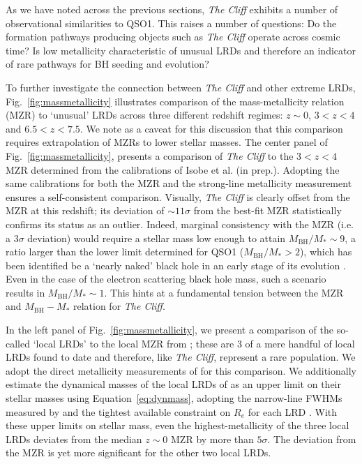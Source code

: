 \documentclass[fleqn,usenatbib]{mnras}
\newcommand{\cliff}{\textit{The Cliff}\xspace}
\begin{document}
As we have noted across the previous sections, \cliff exhibits a number of observational similarities to QSO1. This raises a number of questions: Do the formation pathways producing objects such as \cliff operate across cosmic time? Is low metallicity characteristic of unusual LRDs and therefore an indicator of rare pathways for BH seeding and evolution? 

To further investigate the connection between \cliff and other extreme LRDs, Fig.~\ref{fig:massmetallicity} illustrates comparison of the mass-metallicity relation (MZR) to `unusual' LRDs across three different redshift regimes: $z\sim0$, $3<z<4$ and $6.5<z<7.5$. We note as a caveat for this discussion that this comparison requires extrapolation of MZRs to lower stellar masses. The center panel of Fig.~\ref{fig:massmetallicity}, presents a comparison of \cliff to the $3<z<4$ MZR determined from the calibrations of Isobe et al. (in prep.). Adopting the same calibrations for both the MZR and the strong-line metallicity measurement ensures a self-consistent comparison. 
Visually, \cliff is clearly offset from the MZR at this redshift; its deviation of $\sim11 \sigma$ from the best-fit MZR statistically confirms its status as an outlier.
Indeed, marginal consistency with the MZR (i.e. a $3 \sigma$ deviation) would require a stellar mass low enough to attain $M_\mathrm{BH}/M_\ast \sim 9$, a ratio larger than the lower limit determined for QSO1 ($M_\mathrm{BH}/M_\ast > 2$), which has been identified be a `nearly naked' black hole in an early stage of its evolution \citep{Juodzbalis2025_QSO1}. Even in the case of the electron scattering black hole mass, such a scenario results in $M_\mathrm{BH}/M_\ast \sim 1$. This hints at a fundamental tension between the MZR and $M_\mathrm{BH}-M_\ast$ relation for \cliff.

In the left panel of Fig.~\ref{fig:massmetallicity}, we present a comparison of the so-called `local LRDs' \citep[$z\sim0.1-0.22$][]{Lin2026} to the local MZR from \cite{Curti2020}; these are 3 of a mere handful of local LRDs found to date \citep{Lin2025, Lin2026} and therefore, like \cliff, represent a rare population.
We adopt the direct metallicity measurements of \cite{Lin2026} for this comparison.
We additionally estimate the dynamical masses of the local LRDs of \cite{Lin2026} as an upper limit on their stellar masses using Equation~\ref{eq:dynmass}, adopting the narrow-line FWHMs measured by \cite{Lin2026} and the tightest available constraint on $R_e$ for each LRD \citep[i.e. from][]{Lin2026, Ji2026}.
With these upper limits on stellar mass, even the highest-metallicity of the three local LRDs deviates from the median $z\sim0$ MZR by more than $5\sigma$. The deviation from the MZR is yet more significant for the other two local LRDs.
\end{document}
